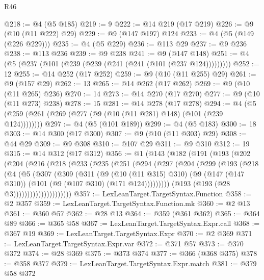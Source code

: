 \begin{lexlean}{R46}
\begin{coremodule}
@218 := @4 (@5 @185)
@219 := 9
@222 := @14 @219 (@17 @219)
@226 := @9 (@10 (@11 @222) @29)
@229 := @9 (@147 @197) @124
@233 := @4 (@5 (@149 (@226 @229)))
@235 := @4 (@5 @229)
@236 := @113 @29
@237 := @9 @236
@238 := @113 @236
@239 := @9 @238
@241 := @9 (@147 @148)
@251 := @4 (@5 (@237 (@101 (@239 (@239 (@241 (@241 (@101 (@237 @124)))))))))
@252 := 12
@255 := @14 @252 (@17 @252)
@259 := @9 (@10 (@11 @255) @29)
@261 := @9 (@157 @29)
@262 := 13
@265 := @14 @262 (@17 @262)
@269 := @9 (@10 (@11 @265) @236)
@270 := 14
@273 := @14 @270 (@17 @270)
@277 := @9 (@10 (@11 @273) @238)
@278 := 15
@281 := @14 @278 (@17 @278)
@294 := @4 (@5 (@259 (@261 (@269 (@277 (@9 (@10 (@11 @281) @148) (@101 (@239 @124))))))))
@297 := @4 (@5 (@101 @189))
@299 := @4 (@5 @183)
@300 := 18
@303 := @14 @300 (@17 @300)
@307 := @9 (@10 (@11 @303) @29)
@308 := @44 @29
@309 := @9 @308
@310 := @107 @29
@311 := @9 @310
@312 := 19
@315 := @14 @312 (@17 @312)
@356 := @1
    (@143
      (@182
        (@191
          (@193
            (@202
              (@204
                (@216
                  (@218
                    (@233
                      (@235
                        (@251
                          (@294
                            (@297
                              (@204
                                (@299
                                  (@193
                                    (@218
                                      (@4
                                        (@5
                                          (@307
                                            (@309
                                              (@311
                                                (@9
                                                  (@10 (@11 @315) @310)
                                                  (@9
                                                    (@147 (@147 @310))
                                                    (@101 (@9 (@107 @310) (@171 @124)))))))))
                                        (@193 (@193 (@28 @3)))))))))))))))))))))
@357 := LexLeanTarget.TargetSyntax.Function
@358 := @2 @357
@359 := LexLeanTarget.TargetSyntax.Function.mk
@360 := @2 @13
@361 := @360 @57
@362 := @28 @13
@364 := @359 (@361 @362)
@365 := @364 @89
@366 := @365 @58
@367 := LexLeanTarget.TargetSyntax.Expr.call
@368 := @367 @19
@369 := LexLeanTarget.TargetSyntax.Expr
@370 := @2 @369
@371 := LexLeanTarget.TargetSyntax.Expr.var
@372 := @371 @57
@373 := @370 @372
@374 := @28 @369
@375 := @373 @374
@377 := @366 (@368 @375)
@378 := @358 @377
@379 := LexLeanTarget.TargetSyntax.Expr.match
@381 := @379 @58 @372

\end{coremodule}
\end{lexlean}
